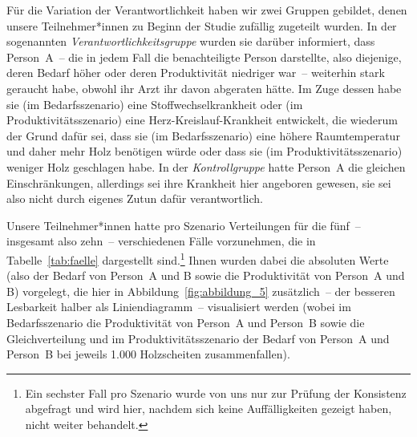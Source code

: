 \documentclass[justified,nobib,nohyper,symmetric,twoside]{tufte-book}
\begin{document}
Für die Variation der Verantwortlichkeit haben wir zwei Gruppen gebildet, denen unsere Teilnehmer*innen zu Beginn der Studie zufällig zugeteilt wurden.
In der sogenannten \textit{Verantwortlichkeitsgruppe} wurden sie darüber informiert, dass Person~A~-- die in jedem Fall die benachteiligte Person darstellte, also diejenige, deren Bedarf höher oder deren Produktivität niedriger war~-- weiterhin stark geraucht habe, obwohl ihr Arzt ihr davon abgeraten hätte.
Im Zuge dessen habe sie (im Bedarfsszenario) eine Stoffwechselkrankheit oder (im Produktivitätsszenario) eine Herz-Kreislauf-Krankheit entwickelt, die wiederum der Grund dafür sei, dass sie (im Bedarfsszenario) eine höhere Raumtemperatur und daher mehr Holz benötigen würde oder dass sie (im Produktivitätsszenario) weniger Holz geschlagen habe.
In der \textit{Kontrollgruppe} hatte Person~A die gleichen Einschränkungen, allerdings sei ihre Krankheit hier angeboren gewesen, sie sei also nicht durch eigenes Zutun dafür verantwortlich.

Unsere Teilnehmer*innen hatte pro Szenario Verteilungen für die fünf~-- insgesamt also zehn~-- verschiedenen Fälle vorzunehmen, die in Tabelle~\ref{tab:faelle} dargestellt sind.\footnote{Ein sechster Fall pro Szenario wurde von uns nur zur Prüfung der Konsistenz abgefragt und wird hier, nachdem sich keine Auffälligkeiten gezeigt haben, nicht weiter behandelt.}
Ihnen wurden dabei die absoluten Werte (also der Bedarf von Person~A und B sowie die Produktivität von Person~A und B) vorgelegt, die hier in Abbildung~\ref{fig:abbildung_5} zusätzlich~-- der besseren Lesbarkeit halber als Liniendiagramm~-- visualisiert werden (wobei im Bedarfsszenario die Produktivität von Person~A und Person~B sowie die Gleichverteilung und im Produktivitätsszenario der Bedarf von Person~A und Person~B bei jeweils 1.000 Holzscheiten zusammenfallen).
\end{document}
